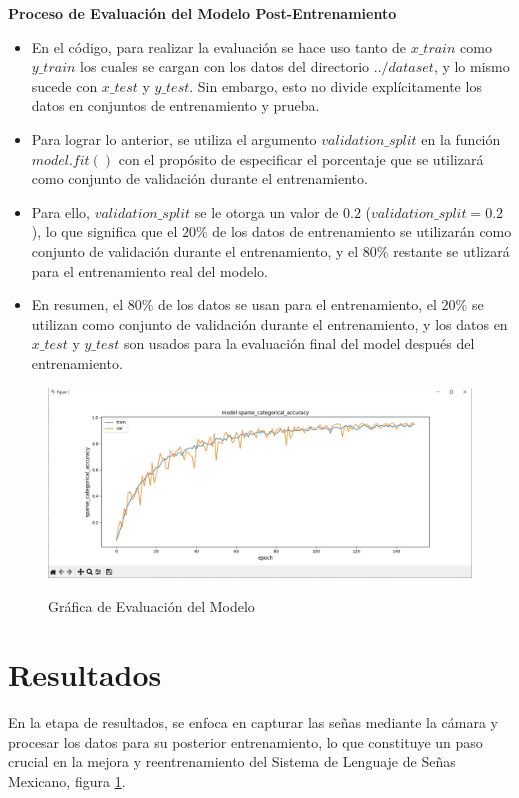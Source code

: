 \documentclass[conference]{IEEEtran}
\begin{document}
\textbf{Proceso de Evaluación del Modelo Post-Entrenamiento}

\begin{itemize}
    \item En el código, para realizar la evaluación se hace uso tanto de $x\_train$ como $y\_train$ los cuales se cargan con los datos del directorio $../dataset$, y lo mismo sucede con $x\_test$ y $y\_test$. Sin embargo, esto no divide explícitamente los datos en conjuntos de entrenamiento y prueba.
    \item Para lograr lo anterior, se utiliza el argumento $validation\_split$ en la función $model.fit()$ con el propósito de especificar el porcentaje que se utilizará como conjunto de validación durante el entrenamiento.
    \item Para ello, $validation\_split$ se le otorga un valor de $0.2$ ($validation\_split=0.2$), lo que significa que el $20\%$ de los datos de entrenamiento se utilizarán como conjunto de validación durante el entrenamiento, y el $80\%$ restante se utlizará para el entrenamiento real del modelo.
    \item En resumen, el $80\%$ de los datos se usan para el entrenamiento, el $20\%$ se utilizan como conjunto de validación durante el entrenamiento, y los datos en $x\_test$ y $y\_test$ son usados para la evaluación final del model después del entrenamiento.
\end{itemize}

\begin{figure}[h]
\centering
{\includegraphics[width=0.95\linewidth]{img/grafica-evaluacion-de-modelo.jpeg}}
\caption{Gráfica de Evaluación del Modelo}
\label{fig:1}
\end{figure}

\section{Resultados}
En la etapa de resultados, se enfoca en capturar las señas mediante la cámara y procesar los datos para su posterior entrenamiento, lo que constituye un paso crucial en la mejora y reentrenamiento del Sistema de Lenguaje de Señas Mexicano, figura \ref{fig:1}.
\end{document}
